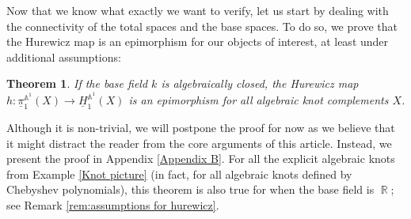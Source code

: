 \documentclass[english]{amsart}
\newtheorem{thm}[prop]{Theorem}
\theoremstyle{definition}
\DeclareMathOperator{\R}{\mathbb{R}}
\DeclareMathOperator{\A}{\mathbb{A}}
\begin{document}
Now that we know what exactly we want to verify, let us start by dealing with the connectivity of the total spaces and the base spaces. To do so, we prove that the Hurewicz map is an epimorphism for our objects of interest, at least under additional assumptions:
\begin{thm}\label{Hurewicz}
If the base field $k$ is algebraically closed, the Hurewicz map $h \colon \underline{\pi}_1^{\A^1}\!(X)\to \underline{H}_1^{\A^1}\!(X)$ is an epimorphism for all algebraic knot complements $X$.
\end{thm}
Although it is non-trivial, we will postpone the proof for now as we believe that it might distract the reader from the core arguments of this article. Instead, we present the proof in Appendix \ref{Appendix B}. For all the explicit algebraic knots from Example \ref{Knot picture} (in fact, for all algebraic knots defined by Chebyshev polynomials), this theorem is also true for when the base field is $\R$; see Remark \ref{rem:assumptions for hurewicz}.
\end{document}
